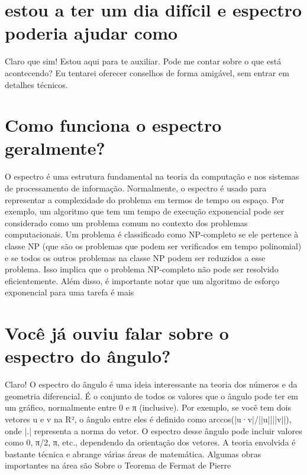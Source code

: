 \documentclass[11pt,a4paper]{article}
\begin{document}
\maketitle
\begin{abstract}Exploração do ollama a partir de sementes banais (nível 3). Teoria continua de fora.\end{abstract}
\section{estou a ter um dia difícil e espectro poderia ajudar como}
Claro que sim! Estou aqui para te auxiliar. Pode me contar sobre o que está acontecendo? Eu tentarei oferecer conselhos de forma amigável, sem entrar em detalhes técnicos.

\section{Como funciona o espectro geralmente?}
O espectro é uma estrutura fundamental na teoria da computação e nos sistemas de processamento de informação. Normalmente, o espectro é usado para representar a complexidade do problema em termos de tempo ou espaço. Por exemplo, um algoritmo que tem um tempo de execução exponencial pode ser considerado como um problema comum no contexto dos problemas computacionais. Um problema é classificado como NP-completo se ele pertence à classe NP (que são os problemas que podem ser verificados em tempo polinomial) e se todos os outros problemas na classe NP podem ser reduzidos a esse problema. Isso implica que o problema NP-completo não pode ser resolvido eficientemente. Além disso, é importante notar que um algoritmo de esforço exponencial para uma tarefa é mais

\section{Você já ouviu falar sobre o espectro do ângulo?}
Claro! O espectro do ângulo é uma ideia interessante na teoria dos números e da geometria diferencial. É o conjunto de todos os valores que o ângulo pode ter em um gráfico, normalmente entre 0 e π (inclusive). Por exemplo, se você tem dois vetores u e v na R², o ângulo entre eles é definido como arccos(|u·v|/||u||||v||), onde |.| representa a norma do vetor. O espectro desse ângulo pode incluir valores como 0, π/2, π, etc., dependendo da orientação dos vetores. A teoria envolvida é bastante técnica e abrange várias áreas de matemática. Algumas obras importantes na área são Sobre o Teorema de Fermat de Pierre
\end{document}
